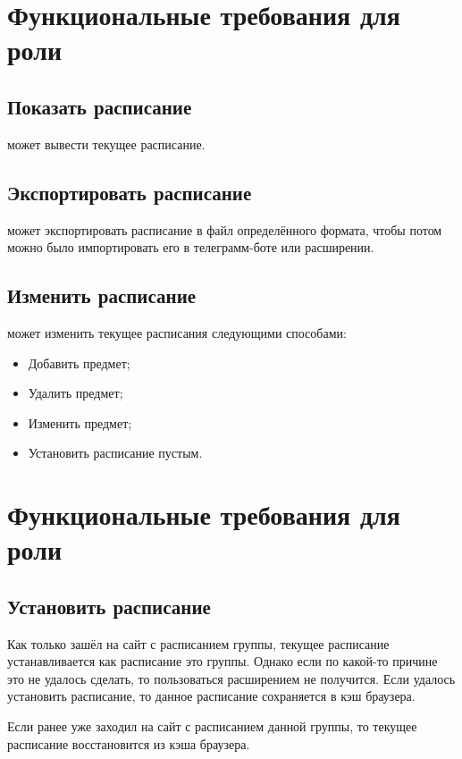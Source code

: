 	\section{Функциональные требования для роли }
		\subsection{Показать расписание}
			 может вывести текущее расписание.
		\subsection{Экспортировать расписание}
			 может экспортировать расписание в файл определённого формата, чтобы потом можно было импортировать его в телеграмм-боте или расширении.
		\subsection{Изменить расписание}
			 может изменить текущее расписания следующими способами:
			\begin{itemize}
				\item Добавить предмет;
				
				\item Удалить предмет;
				
				\item Изменить предмет;
				
				\item Установить расписание пустым.
			\end{itemize}
	\section{Функциональные требования для роли }
		\subsection{Установить расписание}
			Как только  зашёл на сайт с расписанием группы, текущее расписание устанавливается как расписание это группы. Однако если по какой-то причине это не удалось сделать, то пользоваться расширением не получится.  Если удалось установить расписание, то данное расписание сохраняется в кэш браузера.
			
			Если  ранее уже заходил на сайт с расписанием данной группы, то текущее расписание восстановится из кэша браузера.
